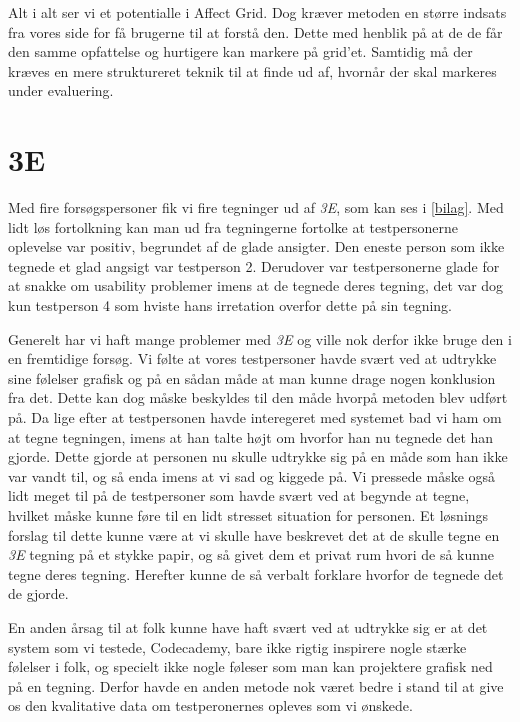 Alt i alt ser vi et potentialle i Affect Grid. Dog kræver metoden en større indsats fra vores side for få brugerne til at forstå den. Dette med henblik på at de de får den samme opfattelse og hurtigere kan markere på grid'et. Samtidig må der kræves en mere struktureret teknik til at finde ud af, hvornår der skal markeres under evaluering.  


\section{3E}\label{sec:eval3E}
Med fire forsøgspersoner fik vi fire tegninger ud af \textit{3E}, som kan ses i \cref{bilag}. Med lidt løs fortolkning kan man ud fra tegningerne fortolke at testpersonerne oplevelse var positiv, begrundet af de glade ansigter. Den eneste person som ikke tegnede et glad angsigt var testperson 2. Derudover var testpersonerne glade for at snakke om usability problemer imens at de tegnede deres tegning, det var dog kun testperson 4 som hviste hans irretation overfor dette på sin tegning. 

Generelt har vi haft mange problemer med \textit{3E} og ville nok derfor ikke bruge den i en fremtidige forsøg. Vi følte at vores testpersoner havde svært ved at udtrykke sine følelser grafisk og på en sådan måde at man kunne drage nogen konklusion fra det. Dette kan dog måske beskyldes til den måde hvorpå metoden blev udført på. Da lige efter at testpersonen havde interegeret med systemet bad vi ham om at tegne tegningen, imens at han talte højt om hvorfor han nu tegnede det han gjorde. Dette gjorde at personen nu skulle udtrykke sig på en måde som han ikke var vandt til, og så enda imens at vi sad og kiggede på. Vi pressede måske også lidt meget til på de testpersoner som havde svært ved at begynde at tegne, hvilket måske kunne føre til en lidt stresset situation for personen. Et løsnings forslag til dette kunne være at vi skulle have beskrevet det at de skulle tegne  en \textit{3E} tegning på et stykke papir, og så givet dem et privat rum hvori de så kunne tegne deres tegning. Herefter kunne de så verbalt forklare hvorfor de tegnede det de gjorde.

En anden årsag til at folk kunne have haft svært ved at udtrykke sig er at det system som vi testede, Codecademy, bare ikke rigtig inspirere nogle stærke følelser i folk, og specielt ikke nogle føleser som man kan projektere grafisk ned på en tegning. Derfor havde en anden metode nok været bedre i stand til at give os den kvalitative data om testperonernes opleves som vi ønskede.